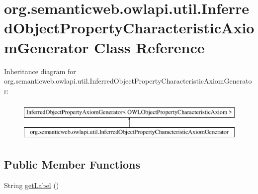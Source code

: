 \hypertarget{classorg_1_1semanticweb_1_1owlapi_1_1util_1_1_inferred_object_property_characteristic_axiom_generator}{\section{org.\-semanticweb.\-owlapi.\-util.\-Inferred\-Object\-Property\-Characteristic\-Axiom\-Generator Class Reference}
\label{classorg_1_1semanticweb_1_1owlapi_1_1util_1_1_inferred_object_property_characteristic_axiom_generator}
}
Inheritance diagram for org.\-semanticweb.\-owlapi.\-util.\-Inferred\-Object\-Property\-Characteristic\-Axiom\-Generator\-:\begin{figure}[H]
\begin{center}
\leavevmode
\includegraphics[height=2.000000cm]{classorg_1_1semanticweb_1_1owlapi_1_1util_1_1_inferred_object_property_characteristic_axiom_generator}
\end{center}
\end{figure}
\subsection*{Public Member Functions}
\begin{DoxyCompactItemize}
\item 
String \hyperlink{classorg_1_1semanticweb_1_1owlapi_1_1util_1_1_inferred_object_property_characteristic_axiom_generator_a700d67630568ff16f130331b45659abc}{get\-Label} ()
\end{DoxyCompactItemize}
